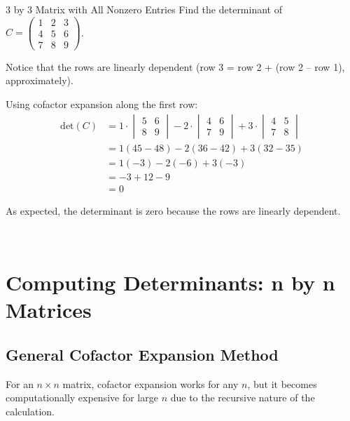 \documentclass[12pt,a4paper]{article}
\newcommand{\Det}{\text{det}}
\begin{document}
	\begin{example}{3 by 3 Matrix with All Nonzero Entries}
		Find the determinant of $C = \begin{pmatrix} 1 & 2 & 3 \\ 4 & 5 & 6 \\ 7 & 8 & 9 \end{pmatrix}$.
		
		Notice that the rows are linearly dependent (row 3 = row 2 + (row 2 -- row 1), approximately).
		
		Using cofactor expansion along the first row:
		\begin{align*}
			\Det(C) &= 1 \cdot \begin{vmatrix} 5 & 6 \\ 8 & 9 \end{vmatrix} - 2 \cdot \begin{vmatrix} 4 & 6 \\ 7 & 9 \end{vmatrix} + 3 \cdot \begin{vmatrix} 4 & 5 \\ 7 & 8 \end{vmatrix} \\
			&= 1(45 - 48) - 2(36 - 42) + 3(32 - 35) \\
			&= 1(-3) - 2(-6) + 3(-3) \\
			&= -3 + 12 - 9 \\
			&= 0
		\end{align*}
		
		As expected, the determinant is zero because the rows are linearly dependent.
		
		\
		
	\end{example}
	
	\section{Computing Determinants: n by n Matrices}
	
	\subsection{General Cofactor Expansion Method}
	
	For an $n \times n$ matrix, cofactor expansion works for any $n$, but it becomes computationally expensive for large $n$ due to the recursive nature of the calculation.
	
\end{document}

